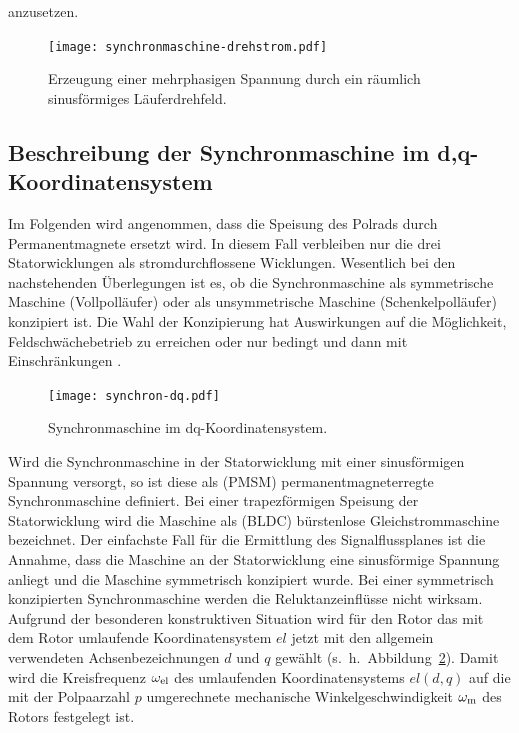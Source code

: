anzusetzen.

\begin{figure}[!htb]
\centering
\texttt{[image: synchronmaschine-drehstrom.pdf]}
\label{fig:drehstromwicklung}
\caption{Erzeugung einer mehrphasigen Spannung durch ein räumlich sinusförmiges Läuferdrehfeld.}
\end{figure}

\subsection{Beschreibung der Synchronmaschine im d,q-Koordinatensystem}\label{sec:synchron-dq}

Im Folgenden wird angenommen, dass die Speisung des Polrads durch Permanentmagnete ersetzt wird.
In diesem Fall verbleiben nur die drei Statorwicklungen als stromdurchflossene Wicklungen.
Wesentlich bei den nachstehenden Überlegungen ist es, ob die Synchronmaschine als symmetrische Maschine (Vollpolläufer) oder als unsymmetrische Maschine (Schenkelpolläufer) konzipiert ist.
Die Wahl der Konzipierung hat Auswirkungen auf die Möglichkeit, Feldschwächebetrieb zu erreichen oder nur bedingt und dann mit Einschränkungen \autocite[S.~291]{schroder2000}.

\begin{figure}[!htb]
\centering
\texttt{[image: synchron-dq.pdf]}
\label{fig:synchron-dq}
\caption{Synchronmaschine im dq-Koordinatensystem.}
\end{figure}

Wird die Synchronmaschine in der Statorwicklung mit einer sinusförmigen Spannung versorgt, so ist diese als (PMSM) permanentmagneterregte Synchronmaschine definiert.
Bei einer trapezförmigen Speisung der Statorwicklung wird die Maschine als (BLDC) bürstenlose Gleichstrommaschine bezeichnet.
Der einfachste Fall für die Ermittlung des Signalflussplanes ist die Annahme, dass die Maschine an der Statorwicklung eine sinusförmige Spannung anliegt und die Maschine symmetrisch konzipiert wurde.
Bei einer symmetrisch konzipierten Synchronmaschine werden die Reluktanzeinflüsse nicht wirksam.
Aufgrund der besonderen konstruktiven Situation wird für den Rotor das mit dem Rotor umlaufende Koordinatensystem $el$ jetzt mit den allgemein verwendeten Achsenbezeichnungen $d$ und $q$ gewählt (s.~h.~Abbildung~\ref{fig:synchron-dq}).
Damit wird die Kreisfrequenz $\omega_{\mathrm{el}}$ des umlaufenden Koordinatensystems $el(d, q)$ auf die mit der Polpaarzahl $p$ umgerechnete mechanische Winkelgeschwindigkeit $\omega_{\mathrm{m}}$ des Rotors festgelegt ist.

